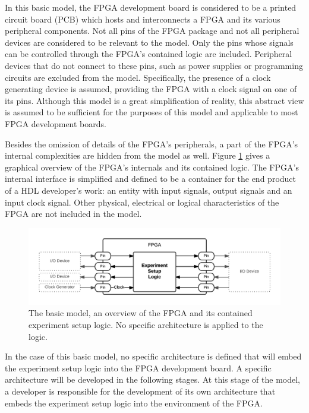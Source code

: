 \documentclass[openright]{uva-bachelor-thesis}
\begin{document}
In this basic model, the FPGA development board is considered to be a printed circuit board (PCB) which hosts and interconnects a FPGA and its various peripheral components. Not all pins of the FPGA package and not all peripheral devices are considered to be relevant to the model. Only the pins whose signals can be controlled through the FPGA's contained logic are included. Peripheral devices that do not connect to these pins, such as power supplies or programming circuits are excluded from the model. Specifically, the presence of a clock generating device is assumed, providing the FPGA with a clock signal on one of its pins. Although this model is a great simplification of reality, this abstract view is assumed to be sufficient for the purposes of this model and applicable to most FPGA development boards. 

Besides the omission of details of the FPGA's peripherals, a part of the FPGA's internal complexities are hidden from the model as well. Figure \ref{fig:fpga-basic} gives a graphical overview of the FPGA's internals and its contained logic. The FPGA's internal interface is simplified and defined to be a container for the end product of a HDL developer's work: an entity with input signals, output signals and an input clock signal. Other physical, electrical or logical characteristics of the FPGA are not included in the model.

\begin{figure}[h]
\centering
\includegraphics[width=\textwidth]{fpga-basic}
\caption{The basic model, an overview of the FPGA and its contained experiment setup logic. No specific architecture is applied to the logic.}
\label{fig:fpga-basic}
\end{figure}

In the case of this basic model, no specific architecture is defined that will embed the experiment setup logic into the FPGA development board. A specific architecture will be developed in the following stages. At this stage of the model, a developer is responsible for the development of its own architecture that embeds the experiment setup logic into the environment of the FPGA.
\end{document}
